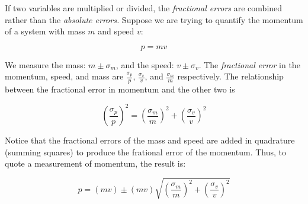 \documentclass[12pt]{article}
\begin{document}
If two variables are multiplied or divided, the \textit{fractional errors} are combined rather than the \textit{absolute errors.}  Suppose we are trying to quantify the momentum of a system with mass $m$ and speed $v$:

\begin{equation}
p = mv
\end{equation}

We measure the mass: $m\pm \sigma_m$, and the speed: $v\pm\sigma_v$.  The \textit{fractional error} in the momentum, speed, and mass are $\frac{\sigma_p}{p}$, $\frac{\sigma_v}{v}$, and $\frac{\sigma_m}{m}$ respectively.  The relationship between the fractional error in momentum and the other two is

\begin{equation}
\left(\frac{\sigma_p}{p}\right)^2 = \left(\frac{\sigma_m}{m}\right)^2 + \left(\frac{\sigma_v}{v}\right)^2
\end{equation}

Notice that the fractional errors of the mass and speed are added in quadrature (summing squares) to produce the frational error of the momentum.  Thus, to quote a measurement of momentum, the result is:

\begin{equation}
p = (mv) \pm (mv) \sqrt{\left(\frac{\sigma_m}{m}\right)^2 + \left(\frac{\sigma_v}{v}\right)^2}
\end{equation}
\end{document}
